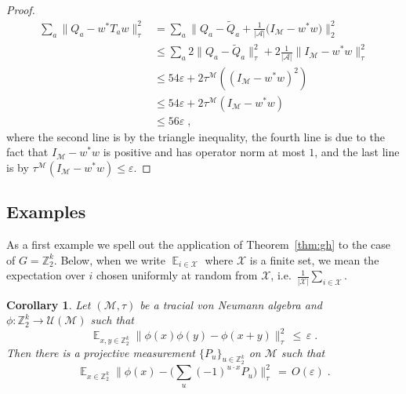 \documentclass[11pt]{article}
\newtheorem{corollary}[theorem]{Corollary}
\theoremstyle{definition}
\DeclareMathOperator*{\Expectation}{\mathbb{E}}
\newcommand{\Es}[1]{\Expectation_{#1}}
\newcommand{\C}{\ensuremath{\mathbb{C}}}
\newcommand{\Z}{\ensuremath{\mathbb{Z}}}
\newcommand{\mA}{\ensuremath{\mathcal{A}}}
\newcommand{\mM}{\ensuremath{\mathcal{M}}}
\newcommand{\mU}{\ensuremath{\mathcal{U}}}
\newcommand{\mX}{\ensuremath{\mathcal{X}}}
\newcommand{\eps}{\varepsilon}
\begin{document}
\begin{proof}
\begin{align*}
\sum_a \big\|{Q}_a - w^*{T}_a w\big\|^2_\tau &= \sum_a \Big\|{Q}_a - \tilde{Q}_a  + \frac{1}{|\mA|}\big(I_\mM - w^* w\big) \Big\|^2_2\\
&\leq  \sum_a 2\big\|{Q}_a - \tilde{Q}_a\big\|_\tau^2  + 2\frac{1}{|\mA|}\big\|I_\mM - w^* w\big\|_\tau^2 \\
&\leq 54 \eps + 2 \tau^\mM( (I_\mM - w^* w)^2 ) \\
&\leq 54 \eps + 2 \tau^\mM(I_\mM - w^* w ) \\
&\leq 56 \eps\;,
\end{align*}
where the second line is by the triangle inequality, the fourth line is due to the fact that $I_\mM - w^* w$ is positive and has operator norm at most $1$, and the last line is by $\tau^\mM(I_\mM - w^* w ) \leq \eps$.
\end{proof}


\subsection{Examples}

As a first example we spell out the application of Theorem~\ref{thm:gh} to the case of $G=\Z_2^k$. 
Below, when we write $\Es{i\in \mX}$ where $\mX$ is a finite set, we mean the expectation over $i$ chosen uniformly at random from $\mX$, i.e.\ $\frac{1}{|\mX|} \sum_{i\in \mX}$. 

\begin{corollary}\label{cor:lin-test} %
Let $(\mM,\tau)$ be a tracial von Neumann algebra and $\phi:\Z_2^k \to \mU(\mM)$ such that 
\[ \Es{x,y\in \Z_2^k} \big\| \phi(x)\phi(y)-\phi(x+y) \big\|_{\tau}^2 \,\leq\,\eps\;.\]
Then there is a %
projective measurement $\{P_u\}_{u\in \Z_2^k}$ on $\mM$ such that 
\[ \Es{x\in \Z_2^k} \Big\| \phi(x) -\Big(\sum_u (-1)^{u\cdot x} P_u\Big)  \Big\|_{\tau}^2 \,=\, O(\eps)\;.\]
\end{corollary} 
\end{document}

